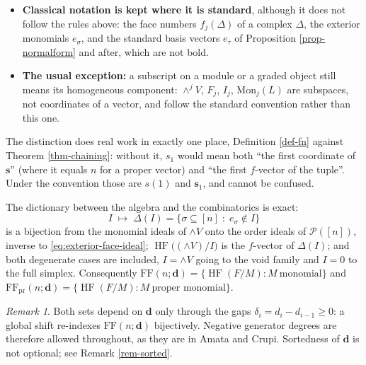 \documentclass[11pt, a4paper, abstract=yes]{scrartcl}
\theoremstyle{definition}
\theoremstyle{remark}
\newtheorem{remark}[definition]{Remark}
\theoremstyle{plain}
\newcommand{\vek}[1]{\boldsymbol{#1}}
\newcommand{\HF}{\operatorname{HF}}
\newcommand{\Ext}{\mathord{\wedge }V}
\begin{document}
\begin{itemize}
\item \textbf{Classical notation is kept where it is standard}, although it does not follow the rules above:
the face numbers \(f_j(\Delta)\) of a complex \(\Delta\), the exterior monomials \(e_\sigma\), and
the standard basis vectors \(e_\tau\) of Proposition \ref{prop-normalform} and after, which are
not bold.
\item \textbf{The usual exception:} a subscript on a module or a graded object still means its
homogeneous component: \(\wedge^jV\), \(F_j\), \(I_j\), \(\mathrm{Mon}_j(L)\) are subspaces, not
coordinates of a vector, and follow the standard convention rather than this one.
\end{itemize}

The distinction does real work in exactly one place, Definition \ref{def-fn} against
Theorem \ref{thm-chaining}: without it, \(s_1\) would mean both ``the first coordinate of \(\vek s\)''
(where it equals \(n\) for a proper vector) and ``the first \(f\)-vector of the tuple''. Under the
convention those are \(s(1)\) and \(\vek s_1\), and cannot be confused.

The dictionary between the algebra and the combinatorics is exact:
\begin{equation}\label{eq:dictionary}
  I\;\longmapsto\;\Delta(I)=\lbrace\sigma\subseteq[n]\;:\;e_\sigma\notin I\rbrace
\end{equation}
is a bijection from the monomial ideals of \(\Ext\) onto the order ideals of \(\mathcal P([n])\), inverse
to \eqref{eq:exterior-face-ideal}; \(\HF\bigl((\Ext)/I\bigr)\) is the \(f\)-vector of \(\Delta(I)\); and both
degenerate cases are included, \(I=\Ext\) going to the void family and \(I=0\) to the full simplex.
Consequently
\(\mathrm{FF}(n;\vek d)=\lbrace\HF(F/M):M\ \text{monomial}\rbrace\) and
\(\mathrm{FF}_{\mathrm{pr}}(n;\vek d)=\lbrace\HF(F/M):M\ \text{proper monomial}\rbrace\).

\begin{remark}
Both sets depend on \(\vek d\) only through the gaps \(\delta_i=d_i-d_{i-1}\ge0\): a global shift
re-indexes \(\mathrm{FF}(n;\vek d)\) bijectively. Negative generator degrees are therefore allowed
throughout, as they are in Amata and Crupi. Sortedness of \(\vek d\) is not optional; see
Remark \ref{rem-sorted}.
\label{rem-shift-only-gaps}
\end{remark}
\end{document}
